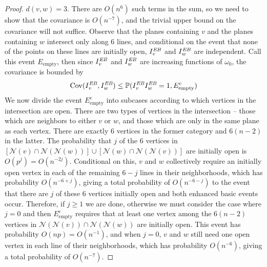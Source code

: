 \documentclass{amsart}
\newcommand{\vect}[1]{{ #1}}
\newcommand{\Cov}{\operatorname{Cov}}
\newcommand{\prob}{\mathbb{P}}
\newcommand{\EB}{I^{\text{\em EB}}}
\numberwithin{equation}{section}
\theoremstyle{definition}
\theoremstyle{remark}
\begin{document}
\begin{proof}
 $d(\vect{v},\vect{w})=3$.  There are $O(n^{6})$ such terms in the sum, so we need to show that the covariance is $O(n^{-7})$, and the trivial upper bound on the covariance will not suffice.  Observe that the planes containing $\vect{v}$ and the planes containing $\vect{w}$ intersect only along 6 lines, and conditional on the event that none of the points on these lines are initially open, $\EB_{\vect{v}}$ and $\EB_{\vect{w}}$ are independent.  Call this event $E_{\text{empty}}$, then since $\EB_{\vect{v}}$ and $\EB_{\vect{w}}$ are increasing functions of $\omega_0$, the covariance is bounded by
\begin{align*}
\Cov(\EB_{\vect{v}},\EB_{\vect{w}}) \leq \prob{(\EB_{\vect{v}}\EB_{\vect{w}} = 1, E_{\text{empty}}^c)}
\end{align*}
We now divide the event $E_{\text{empty}}^c$ into subcases according to which vertices in the intersection are open.  There are two types of vertices in the intersection -- those which are neighbors to either $\vect{v}$ or $\vect{w}$, and those which are only in the same plane as each vertex.  There are exactly 6 vertices in the former category and $6(n-2)$ in the latter.  The probability that $j$ of the 6 vertices in $[\mathcal{N}(\vect{v})\cap\mathcal{N}(\mathcal{N}(\vect{w}))] \cup [\mathcal{N}(\vect{w})\cap\mathcal{N}(\mathcal{N}(\vect{v}))]$ are initially open is $O(p^j) = O(n^{-2j})$.  Conditional on this, $\vect{v}$ and $\vect{w}$ collectively require an initially open vertex in each of the remaining $6-j$ lines in their neighborhoods, which has probability $O(n^{-6+j})$, giving a total probability of $O(n^{-6-j})$ to the event that there are $j$ of these 6 vertices initially open and both enhanced basic events occur.  Therefore, if $j\geq 1$ we are done, otherwise we must consider the case where $j=0$ and then $E_{\text{empty}}^c$
requires that at least one vertex among the $6(n-2)$ vertices in $\mathcal{N}(\mathcal{N}(\vect{v}))\cap\mathcal{N}(\mathcal{N}(\vect{w}))$ are initially open.  This event has probability $O(np) = O(n^{-1})$, and when $j=0$, $\vect{v}$ and $\vect{w}$ still need one open vertex in each line of their neighborhoods, which has probability $O(n^{-6})$, giving a total probability of $O(n^{-7})$.
\end{proof}
\end{document}

